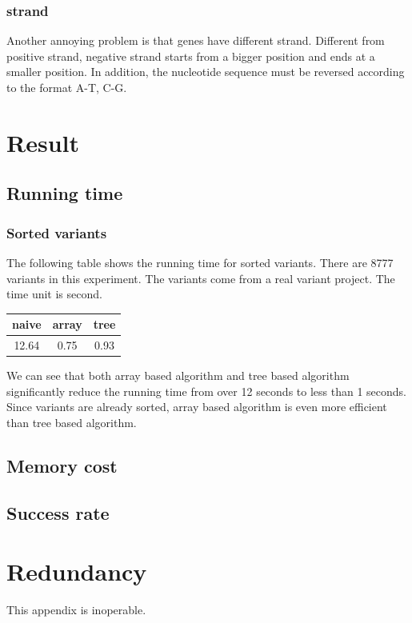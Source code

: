 \documentclass[onehalf,11pt]{beavtex}
\begin{document}
\subsection{strand}
Another annoying problem is that genes have different strand. Different from positive strand, negative strand starts from a bigger position and ends at a smaller position. In addition, the nucleotide sequence must be reversed according to the format A-T, C-G.

\chapter{Result}

\section{Running time}
\subsection{Sorted variants}
The following table shows the running time for sorted variants. There are 8777 variants in this experiment. The variants come from a real variant project. The time unit is second.
\begin{center}
  \begin{tabular}{ c | c | c  }
    \hline
    naive & array & tree \\ \hline
    12.64 & 0.75 & 0.93 \\ \hline
  \end{tabular}
\end{center}

We can see that both array based algorithm and tree based algorithm significantly reduce the running time from over 12 seconds to less than 1 seconds. Since variants are already sorted, array based algorithm is even more efficient than tree based algorithm. 

\section{Memory cost}

\section{Success rate}



\appendix
\chapter{Redundancy}
This appendix is inoperable.
\end{document}
